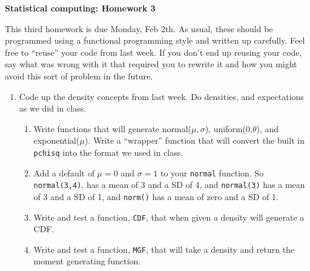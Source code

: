 \renewcommand{\baselinestretch}{1.2}

\centerline{\bf Statistical computing: Homework 3}

\vspace{2ex}

This third homework is due Monday, Feb 2th.  As usual, these should be
programmed using a functional programming style and written up
carefully.  Feel free to ``reuse'' your code from last week.  If you
don't end up reusing your code, say what was wrong with it that
required you to rewrite it and how you might avoid this sort of
problem in the future.

\begin{enumerate}
\item Code up the density concepts from last week.  Do densities,
and expectations as we did in class.  
\begin{enumerate}

\item Write functions that will generate normal($\mu,\sigma$),
uniform(0,$\theta$), and exponential($\mu$).  Write a ``wrapper''
function that will convert the built in {\tt pchisq} into the format
we used in class.  

\item Add a default of $\mu = 0$ and $\sigma =1$ to your {\tt normal}
function.  So {\tt normal(3,4)}, has a mean of 3 and a SD of 4, and
{\tt normal(3)} has a mean of 3 and a SD of 1, and {\tt norm()} has a
mean of zero and a SD of 1.

\item Write and test a function, {\tt CDF}, that when given a
density will generate a CDF.  

\item Write and test a function, {\tt MGF}, that will take a density and return
the moment generating function.


\end{enumerate}
\end{enumerate}
